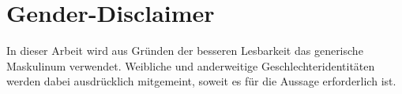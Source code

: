 
\thispagestyle{empty}

\section*{Gender-Disclaimer}

In dieser Arbeit wird aus Gründen der besseren Lesbarkeit das generische Maskulinum
verwendet. Weibliche und anderweitige Geschlechteridentitäten werden dabei
ausdrücklich mitgemeint, soweit es für die Aussage erforderlich ist.
